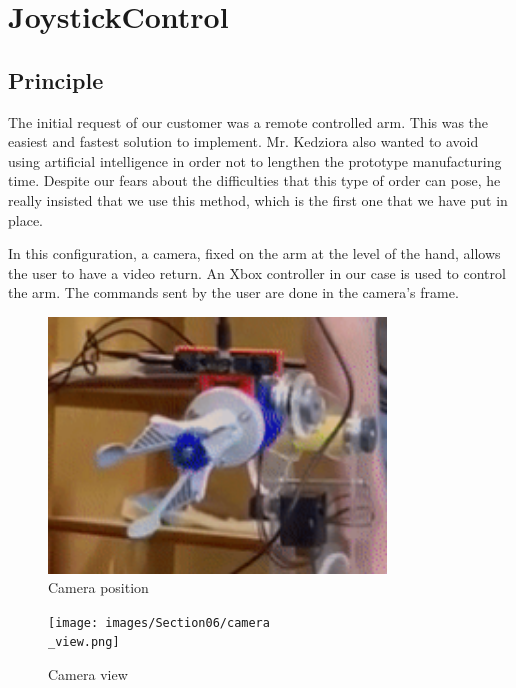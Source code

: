 \section{JoystickControl}\insertloftspace
\setcounter{figure}{0}\setcounter{table}{0}

\subsection{Principle}

The initial request of our customer was a remote controlled arm. This was the easiest and fastest solution to implement. Mr. Kedziora also wanted to avoid using artificial intelligence in order not to lengthen the prototype manufacturing time. Despite our fears about the difficulties that this type of order can pose, he really insisted that we use this method, which is the first one that we have put in place.

\bigbreak
In this configuration, a camera, fixed on the arm at the level of the hand, allows the user to have a video return. An Xbox controller in our case is used to control the arm. The commands sent by the user are done in the camera's frame.

\begin{figure}[ht]
    \centering
    \includegraphics[width=0.8\textwidth]{images/Section06/camera.png}
    \caption{Camera position}
    \label{fig:mesh16}
\end{figure}
\FloatBarrier

\begin{figure}[ht]
    \centering
    \texttt{[image: images/Section06/camera\\\_view.png]}
    \caption{Camera view}
    \label{fig:mesh17}
\end{figure}
\FloatBarrier

